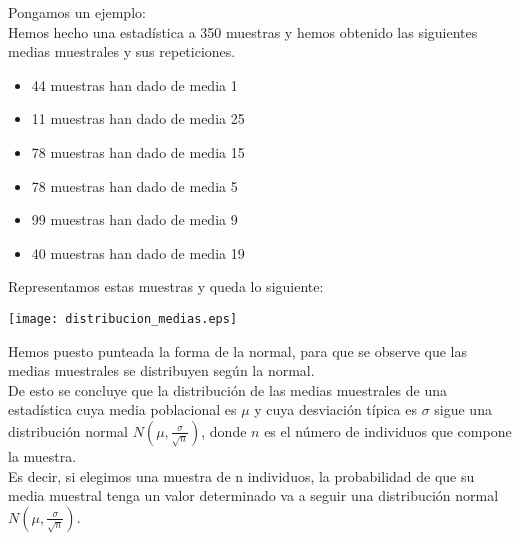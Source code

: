 \documentclass[a4paper,10pt,answers]{exam}
\begin{document}
Pongamos un ejemplo:\\
Hemos hecho una estadística a 350 muestras y hemos obtenido las siguientes medias muestrales y sus repeticiones.
\begin{itemize}
	\item 44 muestras han dado de media 1
	\item 11 muestras han dado de media 25
	\item 78 muestras han dado de media 15
	\item 78 muestras han dado de media 5
	\item 99 muestras han dado de media 9
	\item 40 muestras han dado de media 19
\end{itemize}
Representamos estas muestras y queda lo siguiente:\\
\begin{center}
	\texttt{[image: distribucion\_medias.eps]} 
\end{center}
Hemos puesto punteada la forma de la normal, para que se observe que las medias muestrales se distribuyen según la normal.\\

De esto se concluye que la distribución de las medias muestrales de una estadística cuya media poblacional es $\mu$ y cuya desviación típica es $\sigma$ sigue una distribución normal $N \left(\mu, \frac{\sigma}{\sqrt{n}}\right)$, donde $n$ es el número de individuos que compone la muestra.\\
Es decir, si elegimos una muestra de n individuos, la probabilidad de que su media muestral tenga un valor determinado va a seguir una distribución normal $N\left(\mu, \frac{\sigma}{\sqrt{n}}\right)$.\\
\end{document}
